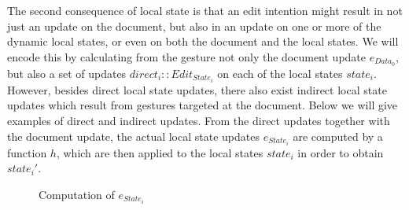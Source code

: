 \documentclass[twoside,epsf]{report}
\begin{document}
The second consequence of local state is that an edit intention might result in not just an update on the document, but also in an update on one or more of the dynamic local states, or even on both the document and the local states. We will encode this by calculating from the gesture not only the document update $e_{Data_0}$, but also a set of updates $direct_i :: Edit_{State_i}$ on each of the local states $state_i$. However, besides direct local state updates, there also exist indirect local state updates which result from gestures targeted at the document. Below we will give examples of direct and indirect updates. From the direct updates together with the document update, the actual local state updates $e_{State_i}$ are computed by a function $h$, which are then applied to the local states $state_i$ in order to obtain $state_i'$.
\begin{figure}
\begin{small}
\begin{center}
\begin{center}
\begin{small}
\bigskip \noindent
{}
\end{small}
\end{center}\caption{Computation of $e_{State_i}$ }\label{estatecomputation} 
\end{center}
\end{small}
\end{figure}
\end{document}
